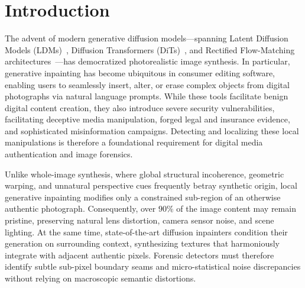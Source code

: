 \section{Introduction}
\label{sec:intro}

The advent of modern generative diffusion models---spanning Latent Diffusion Models (LDMs)~\cite{ldm}, Diffusion Transformers (DiTs)~\cite{dit}, and Rectified Flow-Matching architectures~\cite{flux}---has democratized photorealistic image synthesis. In particular, generative inpainting has become ubiquitous in consumer editing software, enabling users to seamlessly insert, alter, or erase complex objects from digital photographs via natural language prompts. While these tools facilitate benign digital content creation, they also introduce severe security vulnerabilities, facilitating deceptive media manipulation, forged legal and insurance evidence, and sophisticated misinformation campaigns. Detecting and localizing these local manipulations is therefore a foundational requirement for digital media authentication and image forensics.

Unlike whole-image synthesis, where global structural incoherence, geometric warping, and unnatural perspective cues frequently betray synthetic origin, local generative inpainting modifies only a constrained sub-region of an otherwise authentic photograph. Consequently, over $90\%$ of the image content may remain pristine, preserving natural lens distortion, camera sensor noise, and scene lighting. At the same time, state-of-the-art diffusion inpainters condition their generation on surrounding context, synthesizing textures that harmoniously integrate with adjacent authentic pixels. Forensic detectors must therefore identify subtle sub-pixel boundary seams and micro-statistical noise discrepancies without relying on macroscopic semantic distortions.

